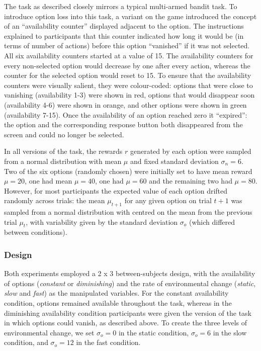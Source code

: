 \documentclass[a4paper,doc,natbib]{apa6}
\begin{document}
The task as described closely mirrors a typical multi-armed bandit task. To introduce option loss into this task, a variant on the game introduced the concept of an ``availability counter'' displayed adjacent to the option. The instructions explained to participants that this counter indicated how long it would be (in terms of number of actions) before this option ``vanished'' if it was not selected. All six availability counters started at a value of 15. The availability counters for every non-selected option would decrease by one after every action, whereas the counter for the selected option would reset to 15. To ensure that the availability counters were visually salient, they were colour-coded: options that were close to vanishing (availability 1-3) were shown in red, options that would disappear soon (availability 4-6) were shown in orange, and other options were shown in green (availability 7-15). Once the availability of an option reached zero it ``expired'': the option and the corresponding response button both disappeared from the screen and could no longer be selected.

In all versions of the task, the rewards $r$ generated by each option were sampled from a normal distribution with mean $\mu$ and fixed standard deviation $\sigma_n = 6$. Two of the six options (randomly chosen) were initially set to have mean reward $\mu = 20$, one had mean $\mu = 40$, one had $\mu = 60$ and the remaining two had $\mu = 80$. However, for most participants the expected value of each option drifted randomly across trials: the mean $\mu_{t+1}$ for any given option on trial $t+1$ was sampled from a normal distribution with centred on the mean from the previous trial $\mu_t$, with variability given by the standard deviation $\sigma_o$ (which differed between conditions).

\subsubsection{Design}

Both experiments employed a 2 x 3 between-subjects design, with the availability of options (\textit{constant} or \textit{diminishing}) and the rate of environmental change (\textit{static}, \textit{slow} and \textit{fast}) as the manipulated variables. For the constant availability condition, options remained available throughout the task, whereas in the diminishing availability condition participants were given the version of the task in which options could vanish, as described above. To create the three levels of environmental change, we set $\sigma_o = 0$ in the static condition, $\sigma_o = 6$ in the slow condition, and $\sigma_o = 12$ in the fast condition.
\end{document}
